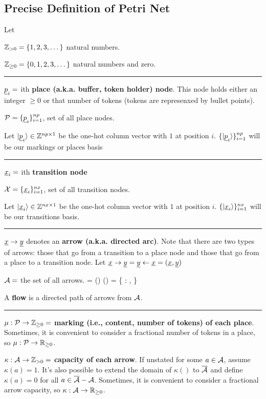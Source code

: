 \subsection{Precise Definition of Petri Net}
Let

${\mathbb{Z}}_{>0}= \{1, 2, 3, \dots\}$ natural numbers.

${\mathbb{Z}}_{\geq 0}= \{0, 1, 2, 3, \dots\}$ natural numbers and zero.

\hrule
$\rvp_i =$ ith {\bf place  (a.k.a. buffer, token holder) node}. This node holds either
an integer $\geq 0$ or that number of tokens (tokens are represenxed by bullet points).

$\calp = \{\rvp_i\}_{i=1}^{np}$, set of all place nodes.


Let $\ket{\rvp_i}\in \ZZ^{np\times 1}$ be the one-hot 
column vector with
$1$ at position $i$. $\{\ket
{\rvp_i}\}_{i=1}^{np}$ will be our {markings or places basis}

\hrule 

$\rvx_i =$ ith {\bf transition node}



$\calx = \{\rvx_i\}_{i=1}^{nx}$, set of all transition nodes.

Let $\ket{\rvx_i}\in \ZZ^{nx\times 1}$ be the one-hot 
column vector with
$1$ at position $i$. $\{\ket
{\rvx_i}\}_{i=1}^{nx}$ will be our {transitions basis}.

\hrule

$\rvx\rarrow \rvy$ denotes an {\bf arrow (a.k.a. directed arc)}. Note that there are two types of arrows:
those that go from a transition to a place node and those that go from a place to
a transition node. Let $\rvx\rarrow\rvy=\rvy\larrow \rvx = (\rvx,\rvy)$

${\cal A} =$  the set of all arrows.
 \beq\cala \subset \ol {\cala} = (\calp \times \calx) \cup (\calx \times \calp) = \{\calp\rarrow\calx {} \calx \rarrow \calp:
\rvp\in\calp, \rvx \in \calx\}\eeq


A {\bf flow} is a directed path of arrows from ${\cal A}$.

\hrule
$\mu : {\cal P} \rightarrow {\mathbb{Z}}_{\geq 0}=$ {\bf marking (i.e., content,
number of tokens) of  each place}. Sometimes, it is convenient to consider a fractional number of tokens in a place, so
$\mu : {\cal P} \rightarrow { \mathbb{R}}_{\geq 0}$.



$\kappa : {\cal A}\rightarrow {\mathbb{Z}}_{>0}=$ {\bf capacity of each arrow}. If unstated for some $a\in {\cal A}$, assume $\kappa(a) = 1$. It's also possible to extend the domain of 
$\kappa()$ to $\overline{{\cal A}}$ and define $\kappa(a) = 0$
for all $a\in \overline{{\cal A}}-{\cal A}$. Sometimes, it is convenient to consider a fractional arrow capacity, so
$\kappa : {\cal A} \rightarrow { \mathbb{R}}_{\geq 0}$.

